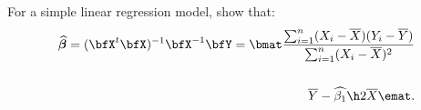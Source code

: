     \begin{exercise}
        For a simple linear regression model, show that:
        \begin{equation*}
        \begin{split}
            \widehat{\boldsymbol{\beta}} 
             = (\bfX^t \bfX)^{-1}\bfX^{-1}\bfY = \bmat \frac{\sum_{i = 1}^n (X_i - \overline{X})(Y_i - \overline{Y})}{\sum_{i = 1}^n (X_i - \overline{X})^2} \\ \\ \overline{Y} - \widehat{\beta_1}\h2\overline{X} \emat.
        \end{split}
        \end{equation*}
    \end{exercise}
    

